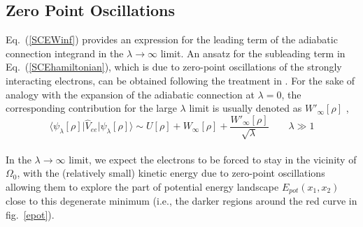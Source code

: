 \documentclass[aps,pra,twocolumn,superscriptaddress]{revtex4}
\begin{document}
\subsection{Zero Point Oscillations}
\label{secondorderSCE}
Eq.~(\ref{SCEWinf}) provides an expression for the leading term of the adiabatic connection integrand in the $\lambda\rightarrow\infty$ limit. An ansatz for the subleading term in Eq.~(\ref{SCEhamiltonian}), which is due to zero-point oscillations of the strongly interacting electrons, can be obtained following the treatment in \citep{GorVigSei-JCTC-09}.
For the sake of analogy with the expansion of the adiabatic connection at $\lambda=0$, the corresponding contribution for the large $\lambda$ limit is usually denoted as $W'_{\infty}[\rho]$ \citep{Sei-PRA-99},
\begin{equation}\label{ZPOexpansion}
\langle\psi_{\lambda}[\rho]\vert\hat{V}_{ee}\vert\psi_{\lambda}[\rho]\rangle\sim
 U[\rho]+W_{\infty}[\rho]+\frac{W'_{\infty}[\rho]}{\sqrt{\lambda}}\quad\quad\lambda\gg 1
\end{equation}\\ In the $\lambda\rightarrow\infty$ limit, we expect the electrons to be forced to stay in the vicinity of $\Omega_0$, with the (relatively small) kinetic energy due to zero-point oscillations allowing them to explore the part of potential energy landscape $E_{pot}(x_1,x_2)$ close to this degenerate minimum (i.e., the darker regions around the red curve in fig.~\ref{epot}).
\end{document}
